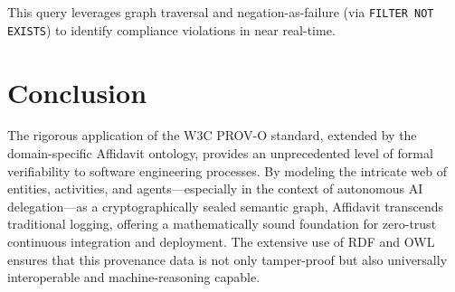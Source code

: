 This query leverages graph traversal and negation-as-failure (via \texttt{FILTER NOT EXISTS}) to identify compliance violations in near real-time.

\section{Conclusion}

The rigorous application of the W3C PROV-O standard, extended by the domain-specific Affidavit ontology, provides an unprecedented level of formal verifiability to software engineering processes. By modeling the intricate web of entities, activities, and agents—especially in the context of autonomous AI delegation—as a cryptographically sealed semantic graph, Affidavit transcends traditional logging, offering a mathematically sound foundation for zero-trust continuous integration and deployment. The extensive use of RDF and OWL ensures that this provenance data is not only tamper-proof but also universally interoperable and machine-reasoning capable.

